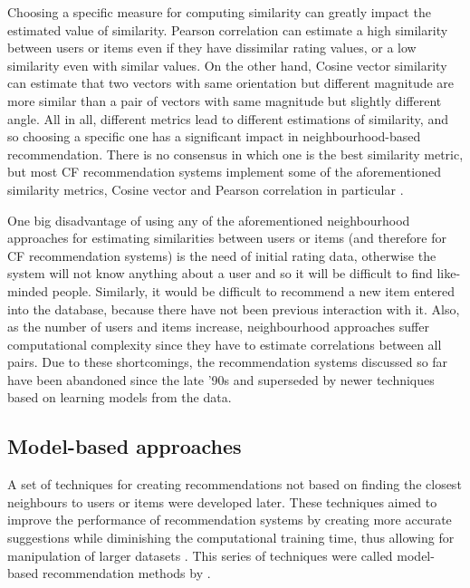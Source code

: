 Choosing a specific measure for computing similarity can greatly impact the estimated value of similarity. Pearson correlation can estimate a high similarity between users or items even if they have dissimilar rating values, or a low similarity even with similar  values. On the other hand, Cosine vector similarity can estimate that two vectors with same orientation but different magnitude are more similar than a pair of vectors with same magnitude but slightly different angle. All in all, different metrics lead to different estimations of similarity, and so choosing a specific one has a significant impact in neighbourhood-based recommendation. There is no consensus in which one is the best similarity metric, but most CF recommendation systems implement some of the aforementioned similarity metrics, Cosine vector and Pearson correlation in particular \autocite{leskovec14mining, ricci15recommender}.


One big disadvantage of using any of the aforementioned neighbourhood approaches for estimating similarities between users or items (and therefore for CF recommendation systems) is the need of initial rating data, otherwise the system will not know anything about a user and so it will be difficult to find like-minded people. 
Similarly, it would be difficult to recommend a new item entered into the database, because there have not been previous interaction with it.
Also, as the number of users and items increase, neighbourhood approaches suffer computational complexity since they have to estimate correlations between all pairs. 
Due to these shortcomings, the recommendation systems discussed so far have been abandoned since the late '90s and superseded by newer techniques based on learning models from the data.

\subsection{Model-based approaches}\label{sub:model} %
A set of techniques for creating recommendations not based on finding the closest neighbours to users or items were developed later. These techniques aimed to improve the performance of recommendation systems by creating more accurate suggestions while diminishing the computational training time, thus allowing for manipulation of larger datasets \autocite{koren15advances}.
This series of techniques were called model-based recommendation methods by \textcite{breese98empirical}.

